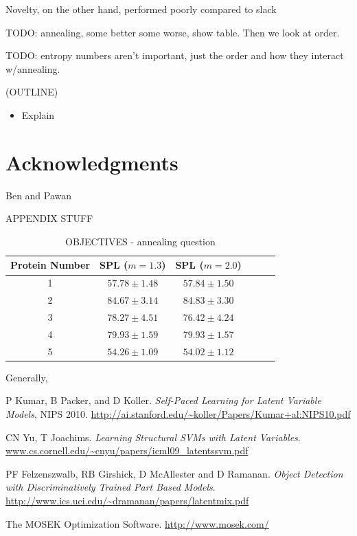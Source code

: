 \documentclass{article}
\begin{document}
Novelty, on the other hand, performed poorly compared to slack


TODO: annealing, some better some worse, show table.  Then we look at order.

TODO: entropy numbers aren't important, just the order and how they interact w/annealing.


(OUTLINE)
\begin{itemize}
\item Explain 
\end{itemize}

\section{Acknowledgments}

Ben and Pawan

APPENDIX STUFF


\begin{table}
\caption{OBJECTIVES - annealing question}
\begin{center}
\begin{tabular}{|c|c|c|c|c|c|}
\hline Protein Number  & SPL ($m=1.3$) & SPL ($m=2.0$) \\\hline
1 & $57.78 \pm 1.48$ & $57.84 \pm 1.50$ \\ \hline
2 & $84.67 \pm 3.14$ & $84.83 \pm 3.30$ \\ \hline
3 & $78.27 \pm 4.51$ & $76.42 \pm 4.24$ \\ \hline
4 & $79.93 \pm 1.59$ & $79.93 \pm 1.57$ \\ \hline
5 & $54.26 \pm 1.09$ & $54.02 \pm 1.12$ \\ \hline
\end{tabular}
\end{center}
\end{table}

Generally, 
\begin{thebibliography}{9}


 P Kumar, B Packer, and D Koller. \emph{Self-Paced Learning for Latent Variable Models},
NIPS 2010. \url{http://ai.stanford.edu/~koller/Papers/Kumar+al:NIPS10.pdf}

 CN Yu, T Joachims. \emph{Learning Structural SVMs with Latent Variables}. \url{www.cs.cornell.edu/~cnyu/papers/icml09_latentssvm.pdf}

 PF Felzenszwalb, RB Girshick, D McAllester and D Ramanan. \emph{Object Detection with Discriminatively Trained
Part Based Models}.  \url{http://www.ics.uci.edu/~dramanan/papers/latentmix.pdf}

 The MOSEK Optimization Software. \url{http://www.mosek.com/}

\end{thebibliography}
\end{document}

